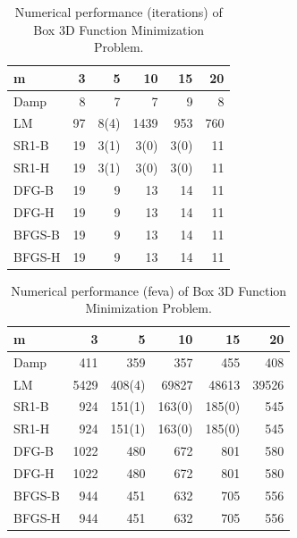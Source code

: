\documentclass{article}
\begin{document}
\begin{table}[t]
\caption{Numerical performance (iterations) of Box 3D Function Minimization Problem.}
\label{tab1}
\vskip 0.15in
\begin{center}
\begin{small}
\begin{sc}
\begin{tabular}{lrrrrr}
\toprule
m & 3 & 5 & 10 & 15 & 20 \\
\midrule
Damp    & 8 & 7 & 7 & 9 & 8 \\
LM & 97 & 8(4) & 1439 & 953 & 760 \\
SR1-B   & 19 & 3(1) & 3(0) & 3(0) & 11 \\
SR1-H   & 19 & 3(1) & 3(0) & 3(0) & 11 \\
DFG-B   & 19 & 9 & 13 & 14 & 11 \\
DFG-H   & 19 & 9 & 13 & 14 & 11 \\
BFGS-B  & 19 & 9 & 13 & 14 & 11 \\
BFGS-H  & 19 & 9 & 13 & 14 & 11 \\
\bottomrule
\end{tabular}
\end{sc}
\end{small}
\end{center}
\vskip -0.1in
\end{table}

\begin{table}[t]
\caption{Numerical performance (feva) of Box 3D Function Minimization Problem.}
\label{tab2}
\vskip 0.15in
\begin{center}
\begin{small}
\begin{sc}
\begin{tabular}{lrrrrr}
\toprule
m & 3 & 5 & 10 & 15 & 20 \\
\midrule
Damp    & 411 & 359 & 357 & 455 & 408 \\
LM & 5429 & 408(4) & 69827 & 48613 & 39526 \\
SR1-B   & 924 & 151(1) & 163(0) & 185(0) & 545 \\
SR1-H   & 924 & 151(1) & 163(0) & 185(0) & 545 \\
DFG-B   & 1022 & 480 & 672 & 801 & 580 \\
DFG-H   & 1022 & 480 & 672 & 801 & 580 \\
BFGS-B  & 944 & 451 & 632 & 705 & 556 \\
BFGS-H  & 944 & 451 & 632 & 705 & 556 \\
\bottomrule
\end{tabular}
\end{sc}
\end{small}
\end{center}
\vskip -0.1in
\end{table}
\end{document}
